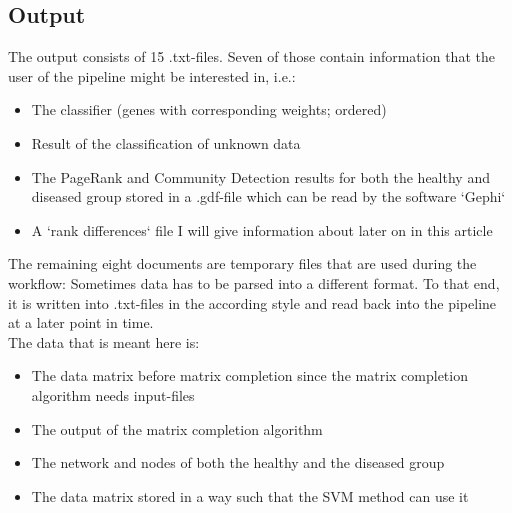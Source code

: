 \documentclass{bioinfo}
\begin{document}
\subsection{Output}
The output consists of 15 .txt-files. Seven of those contain information that the user of the pipeline might be interested in, i.e.:
\begin{itemize}
\item The classifier (genes with corresponding weights; ordered)
\item Result of the classification of unknown data
\item The PageRank and Community Detection results for both the healthy and diseased group stored in a .gdf-file which can be read by the software `Gephi`
\item A `rank differences` file I will give information about later on in this article
\end{itemize}
 The remaining eight documents are temporary files that are used during the workflow: Sometimes data has to be parsed into a different format. To that end, it is written into .txt-files in the according style and read back into the pipeline at a later point in time.\\
The data that is meant here is:
\begin{itemize}
\item The data matrix before matrix completion since the matrix completion algorithm needs input-files
\item The output of the matrix completion algorithm
\item The network and nodes of both the healthy and the diseased group
\item The data matrix stored in a way such that the SVM method can use it
\end{itemize}
\end{document}
